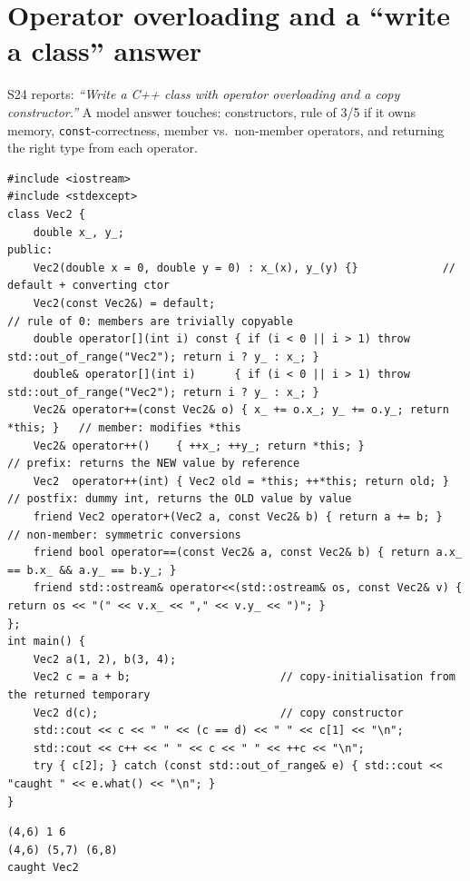 \documentclass[10pt,a4paper,openany,oneside]{report}
\newcommand{\prio}[1]{\texorpdfstring{\ifcase#1\or{\color{gold}\ding{72}}\or{\color{gold}\ding{72}\ding{72}}\or{\color{gold}\ding{72}\ding{72}\ding{72}}\fi}{}}
\begin{document}
\section{Operator overloading and a ``write a class'' answer \prio{3}}
S24 reports: \emph{``Write a C++ class with operator overloading and a copy constructor.''} A model answer touches: constructors, rule of 3/5 if it owns memory, \texttt{const}-correctness, member vs.\ non-member operators, and returning the right type from each operator.
\begin{lstlisting}[language={[11]C++},title={Vec2: value type with overloaded operators}]
#include <iostream>
#include <stdexcept>
class Vec2 {
    double x_, y_;
public:
    Vec2(double x = 0, double y = 0) : x_(x), y_(y) {}             // default + converting ctor
    Vec2(const Vec2&) = default;                                     // rule of 0: members are trivially copyable
    double operator[](int i) const { if (i < 0 || i > 1) throw std::out_of_range("Vec2"); return i ? y_ : x_; }
    double& operator[](int i)      { if (i < 0 || i > 1) throw std::out_of_range("Vec2"); return i ? y_ : x_; }
    Vec2& operator+=(const Vec2& o) { x_ += o.x_; y_ += o.y_; return *this; }   // member: modifies *this
    Vec2& operator++()    { ++x_; ++y_; return *this; }              // prefix: returns the NEW value by reference
    Vec2  operator++(int) { Vec2 old = *this; ++*this; return old; } // postfix: dummy int, returns the OLD value by value
    friend Vec2 operator+(Vec2 a, const Vec2& b) { return a += b; }  // non-member: symmetric conversions
    friend bool operator==(const Vec2& a, const Vec2& b) { return a.x_ == b.x_ && a.y_ == b.y_; }
    friend std::ostream& operator<<(std::ostream& os, const Vec2& v) { return os << "(" << v.x_ << "," << v.y_ << ")"; }
};
int main() {
    Vec2 a(1, 2), b(3, 4);
    Vec2 c = a + b;                       // copy-initialisation from the returned temporary
    Vec2 d(c);                            // copy constructor
    std::cout << c << " " << (c == d) << " " << c[1] << "\n";
    std::cout << c++ << " " << c << " " << ++c << "\n";
    try { c[2]; } catch (const std::out_of_range& e) { std::cout << "caught " << e.what() << "\n"; }
}
\end{lstlisting}
\begin{lstlisting}[style=out,title={Answer: captured output}]
(4,6) 1 6
(4,6) (5,7) (6,8)
caught Vec2
\end{lstlisting}
\end{document}
